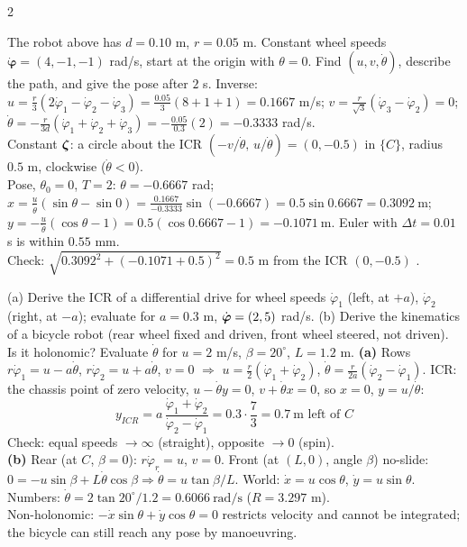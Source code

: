 \begin{multicols}{2}
\begin{examq}
The robot above has $d=0.10$ m, $r=0.05$ m. Constant wheel speeds $\dot{\boldsymbol\varphi}=(4,-1,-1)$ rad/s, start at the origin with $\theta=0$. Find $(u,v,\dot\theta)$, describe the path, and give the pose after $2$ s.
\solution
Inverse: $u=\frac r3(2\dot\varphi_1-\dot\varphi_2-\dot\varphi_3)=\frac{0.05}3(8+1+1)=0.1667$ m/s; $v=\frac r{\sqrt3}(\dot\varphi_3-\dot\varphi_2)=0$; $\dot\theta=-\frac r{3d}(\dot\varphi_1+\dot\varphi_2+\dot\varphi_3)=-\frac{0.05}{0.3}(2)=-0.3333$ rad/s. \\
Constant $\boldsymbol\zeta$: a circle about the ICR $(-v/\dot\theta,\,u/\dot\theta)=(0,-0.5)$ in $\{C\}$, radius $0.5$ m, clockwise ($\dot\theta<0$). \\
Pose, $\theta_0=0$, $T=2$: $\theta=-0.6667$ rad; $x=\frac u{\dot\theta}(\sin\theta-\sin0)=\frac{0.1667}{-0.3333}\sin(-0.6667)=0.5\sin0.6667=\boxed{0.3092\ \text{m}}$; $y=-\frac u{\dot\theta}(\cos\theta-1)=0.5(\cos0.6667-1)=\boxed{-0.1071\ \text{m}}$. Euler with $\Delta t=0.01$ s is within $0.55$ mm. \\
Check: $\sqrt{0.3092^2+(-0.1071+0.5)^2}=0.5$ m from the ICR $(0,-0.5)$ \checkmark. \chk
\end{examq}

\begin{examq}
(a) Derive the ICR of a differential drive for wheel speeds $\dot\varphi_1$ (left, at $+a$), $\dot\varphi_2$ (right, at $-a$); evaluate for $a=0.3$ m, $\dot{\boldsymbol\varphi}=(2,5)$ rad/s. (b) Derive the kinematics of a bicycle robot (rear wheel fixed and driven, front wheel steered, not driven). Is it holonomic? Evaluate $\dot\theta$ for $u=2$ m/s, $\beta=20^\circ$, $L=1.2$ m.
\solution
\textbf{(a)} Rows $r\dot\varphi_1=u-a\dot\theta$, $r\dot\varphi_2=u+a\dot\theta$, $v=0$ $\Rightarrow$ $u=\frac r2(\dot\varphi_1+\dot\varphi_2)$, $\dot\theta=\frac r{2a}(\dot\varphi_2-\dot\varphi_1)$. ICR: the chassis point of zero velocity, $u-\dot\theta y=0$, $v+\dot\theta x=0$, so $x=0$, $y=u/\dot\theta$:
\[\boxed{y_{ICR}=a\,\frac{\dot\varphi_1+\dot\varphi_2}{\dot\varphi_2-\dot\varphi_1}}=0.3\cdot\frac73=\boxed{0.7\ \text{m left of }C}\]
Check: equal speeds $\to\infty$ (straight), opposite $\to0$ (spin). \\
\textbf{(b)} Rear (at $C$, $\beta=0$): $r\dot\varphi_r=u$, $v=0$. Front (at $(L,0)$, angle $\beta$) no-slide: $0=-u\sin\beta+L\dot\theta\cos\beta\Rightarrow\dot\theta=u\tan\beta/L$. World: $\dot x=u\cos\theta$, $\dot y=u\sin\theta$. Numbers: $\dot\theta=2\tan20^\circ/1.2=\boxed{0.6066\ \text{rad/s}}$ ($R=3.297$ m). \\
Non-holonomic: $-\dot x\sin\theta+\dot y\cos\theta=0$ restricts velocity and cannot be integrated; the bicycle can still reach any pose by manoeuvring.  \chk
\end{examq}


\end{multicols}
